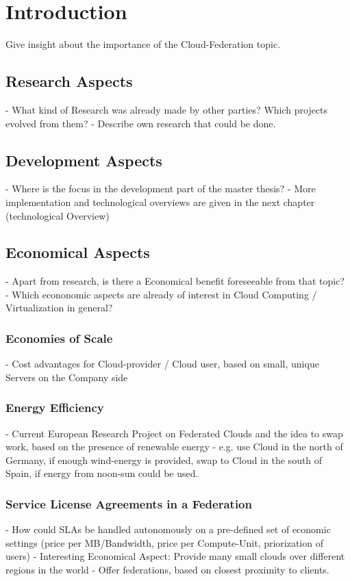 \chapter{Introduction}
Give insight about the importance of the Cloud-Federation topic.



\section{Research Aspects}
- What kind of Research was already made by other parties? Which projects evolved from them?
- Describe own research that could be done.


\section{Development Aspects}
- Where is the focus in the development part of the master thesis?
- More implementation and technological overviews are given in the next chapter (technological Overview)


\section{Economical Aspects}
- Apart from research, is there a Economical benefit foreseeable from that topic?
- Which econonomic aspects are already of interest in Cloud Computing / Virtualization in general?
\subsection{Economies of Scale}
- Cost advantages for Cloud-provider / Cloud user, based on small, unique Servers on the Company side
\subsection{Energy Efficiency}
- Current European Research Project on Federated Clouds and the idea to swap work, based on the presence of renewable energy
- e.g. use Cloud in the north of Germany, if enough wind-energy is provided, swap to Cloud in the south of Spain, if energy from noon-sun could be used.
\subsection{Service License Agreements in a Federation}
- How could SLAs be handled autonomously on a pre-defined set of economic settings (price per MB/Bandwidth, price per Compute-Unit, priorization of users)
- Interesting Economical Aspect: Provide many small clouds over different regions in the world
- Offer federations, based on closest proximity to clients.